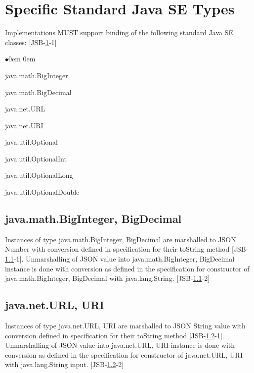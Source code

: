 \section{Specific Standard Java SE Types}
\label{sec:specific}
Implementations MUST support binding of the following standard Java SE classes: [JSB-\ref{sec:specific}-1]
\begin{list}{$\bullet$}{\parsep 0em  0em}
\item java.math.BigInteger
\item java.math.BigDecimal
\item java.net.URL
\item java.net.URI
\item java.util.Optional
\item java.util.OptionalInt
\item java.util.OptionalLong
\item java.util.OptionalDouble
\end{list}

\subsection{java.math.BigInteger, BigDecimal}
\label{subsec:bignumber}
Instances of type java.math.BigInteger, BigDecimal are marshalled to JSON Number with conversion defined in specification for their toString method [JSB-\ref{subsec:bignumber}-1]. Unmarshalling of JSON value into java.math.BigInteger, BigDecimal instance is done with conversion as defined in the specification for constructor of java.math.BigInteger, BigDecimal with java.lang.String. [JSB-\ref{subsec:bignumber}-2]

\subsection{java.net.URL, URI}
\label{subsec:url}
Instances of type java.net.URL, URI are marshalled to JSON String value with conversion defined in specification for their toString method [JSB-\ref{subsec:url}-1]. Unmarshalling of JSON value into java.net.URL, URI instance is done with conversion as defined in the specification for constructor of java.net.URL, URI with java.lang.String input. [JSB-\ref{subsec:url}-2]

